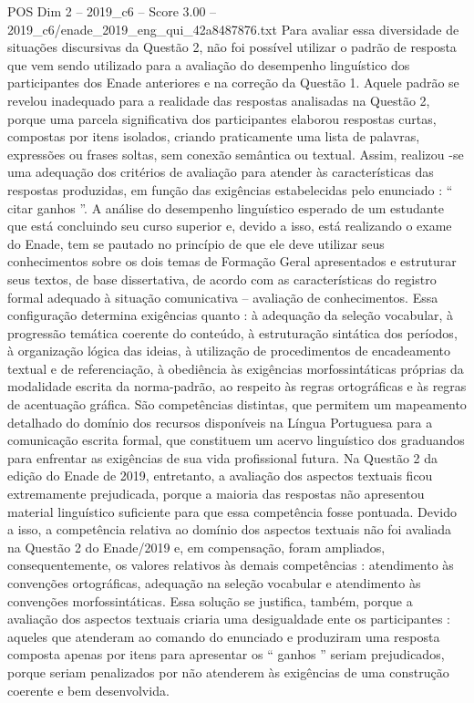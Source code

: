 \begin{textsample}{POS Dim 2 – 2019\_c6 – Score 3.00 – 2019\_c6/enade\_2019\_eng\_qui\_42a8487876.txt}
Para avaliar essa diversidade de situações discursivas da Questão 2, não foi possível utilizar o padrão de resposta que vem sendo utilizado para a avaliação do desempenho linguístico dos participantes dos Enade anteriores e na correção da Questão 1.
Aquele padrão se revelou inadequado para a realidade das respostas analisadas na Questão 2, porque uma parcela significativa dos participantes elaborou respostas curtas, compostas por itens isolados, criando praticamente uma lista de palavras, expressões ou frases soltas, sem conexão semântica ou textual.
Assim, realizou -se uma adequação dos critérios de avaliação para atender às características das respostas produzidas, em função das exigências estabelecidas pelo enunciado : “ citar ganhos ”.
A análise do desempenho linguístico esperado de um estudante que está concluindo seu curso superior e, devido a isso, está realizando o exame do Enade, tem se pautado no princípio de que ele deve utilizar seus conhecimentos sobre os dois temas de Formação Geral apresentados e estruturar seus textos, de base dissertativa, de acordo com as características do registro formal adequado à situação comunicativa – avaliação de conhecimentos.
Essa configuração determina exigências quanto : à adequação da seleção vocabular, à progressão temática coerente do conteúdo, à estruturação sintática dos períodos, à organização lógica das ideias, à utilização de procedimentos de encadeamento textual e de referenciação, à obediência às exigências morfossintáticas próprias da modalidade escrita da norma-padrão, ao respeito às regras ortográficas e às regras de acentuação gráfica.
São competências distintas, que permitem um mapeamento detalhado do domínio dos recursos disponíveis na Língua Portuguesa para a comunicação escrita formal, que constituem um acervo linguístico dos graduandos para enfrentar as exigências de sua vida profissional futura.
Na Questão 2 da edição do Enade de 2019, entretanto, a avaliação dos aspectos textuais ficou extremamente prejudicada, porque a maioria das respostas não apresentou material linguístico suficiente para que essa competência fosse pontuada.
Devido a isso, a competência relativa ao domínio dos aspectos textuais não foi avaliada na Questão 2 do Enade/2019 e, em compensação, foram ampliados, consequentemente, os valores relativos às demais competências : atendimento às convenções ortográficas, adequação na seleção vocabular e atendimento às convenções morfossintáticas.
Essa solução se justifica, também, porque a avaliação dos aspectos textuais criaria uma desigualdade ente os participantes : aqueles que atenderam ao comando do enunciado e produziram uma resposta composta apenas por itens para apresentar os “ ganhos ” seriam prejudicados, porque seriam penalizados por não atenderem às exigências de uma construção coerente e bem desenvolvida.

\end{textsample}
